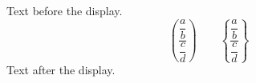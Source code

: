 \documentclass{article}
\begin{document}
Text before the display.
\[
  \left( \frac{\dfrac{a}{b}}{\dfrac{c}{d}} \right)
  \qquad
  \left\{ \frac{\dfrac{a}{b}}{\dfrac{c}{d}} \right\}
\]
Text after the display.
\end{document}
